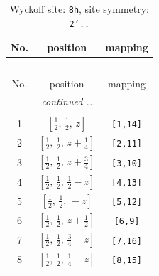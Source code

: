 \documentclass[fleqn,8pt]{jsarticle}
\begin{document}
\begin{longtable}{ccc}
\caption{Wyckoff site: {\tt 8h}, site symmetry: {\tt 2'..}}
 \\
 \hline \hline
No. & position & mapping \\ \hline \endfirsthead

\multicolumn{2}{l}{\tablename\ \thetable{}} \\
 \hline \hline
No. & position & mapping \\ \hline \endhead

 \hline \hline
\multicolumn{2}{r}{\footnotesize\it continued ...} \\ \endfoot

 \hline \hline
\multicolumn{2}{r}{} \\ \endlastfoot

1 & $\left[ \frac{1}{2},\, \frac{1}{2},\, z \right]$ & {\tt [1,14]} \\ \hline
2 & $\left[ \frac{1}{2},\, \frac{1}{2},\, z + \frac{1}{4} \right]$ & {\tt [2,11]} \\ \hline
3 & $\left[ \frac{1}{2},\, \frac{1}{2},\, z + \frac{3}{4} \right]$ & {\tt [3,10]} \\ \hline
4 & $\left[ \frac{1}{2},\, \frac{1}{2},\, \frac{1}{2} - z \right]$ & {\tt [4,13]} \\ \hline
5 & $\left[ \frac{1}{2},\, \frac{1}{2},\, - z \right]$ & {\tt [5,12]} \\ \hline
6 & $\left[ \frac{1}{2},\, \frac{1}{2},\, z + \frac{1}{2} \right]$ & {\tt [6,9]} \\ \hline
7 & $\left[ \frac{1}{2},\, \frac{1}{2},\, \frac{3}{4} - z \right]$ & {\tt [7,16]} \\ \hline
8 & $\left[ \frac{1}{2},\, \frac{1}{2},\, \frac{1}{4} - z \right]$ & {\tt [8,15]} \\
\end{longtable}
\renewcommand{\arraystretch}{1.2}
\end{document}
